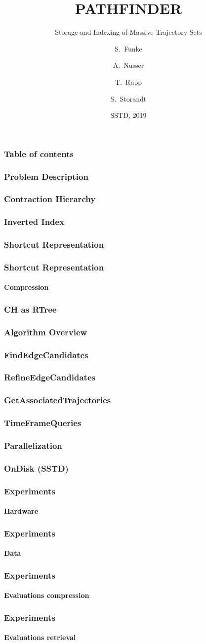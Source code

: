\documentclass{beamer}
\title[Pathfinder] %
{PATHFINDER}
\subtitle{Storage and Indexing of Massive Trajectory Sets}
\author[Funke, Nusser, Rupp, Storandt] %
{S.~Funke\inst{1} \and A.~Nusser\inst{2} \and T.~Rupp\inst{3} \and S.~Storandt\inst{4}}
\institute[Universities] %
{
	\inst{1}%
	University of Stuttgart
	\and
	\inst{2}%
	Max Planck Institute for Informatics
	\and
	\inst{3}%
	University of Stuttgart
	\and
	\inst{4}%
	University of Konstanz
}
\date[SSTD 2019] %
{SSTD, 2019}
\begin{document}
\frame{\titlepage}
\begin{frame}
	\frametitle{Table of contents}
\end{frame}

\begin{frame}

	\frametitle{Problem Description}

\end{frame}
\begin{frame}
	\frametitle{Contraction Hierarchy}
\end{frame}

\begin{frame}
	\frametitle{Inverted Index}
\end{frame}

\begin{frame}
	\frametitle{Shortcut Representation}
\end{frame}

\begin{frame}
	\frametitle{Shortcut Representation}
	\framesubtitle{Compression}
\end{frame}

\begin{frame}
	\frametitle{CH as RTree}
\end{frame}

\begin{frame}
	\frametitle{Algorithm Overview}
\end{frame}

\begin{frame}
	\frametitle{FindEdgeCandidates}
\end{frame}

\begin{frame}
	\frametitle{RefineEdgeCandidates}
\end{frame}

\begin{frame}
	\frametitle{GetAssociatedTrajectories}
\end{frame}

\begin{frame}
	\frametitle{TimeFrameQueries}
\end{frame}

\begin{frame}
	\frametitle{Parallelization}
\end{frame}

\begin{frame}
	\frametitle{OnDisk (SSTD)}
\end{frame}

\begin{frame}
	\frametitle{Experiments}
	\framesubtitle{Hardware}
\end{frame}

\begin{frame}
	\frametitle{Experiments}
	\framesubtitle{Data}
\end{frame}

\begin{frame}
	\frametitle{Experiments}
	\framesubtitle{Evaluations compression}
\end{frame}

\begin{frame}
	\frametitle{Experiments}
	\framesubtitle{Evaluations retrieval}
\end{frame}
\end{document}
